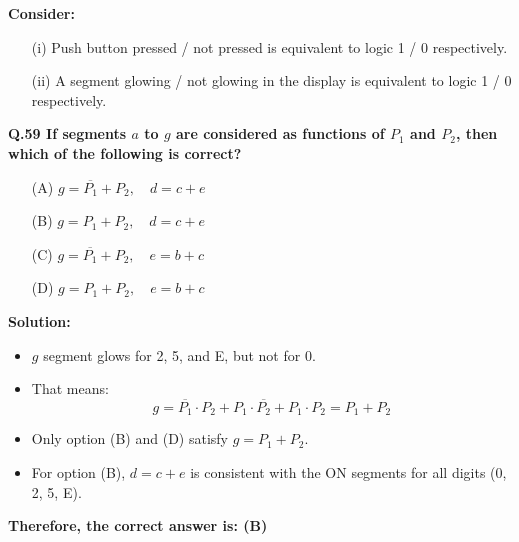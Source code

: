 \documentclass[a4paper,12pt]{article}
\begin{document}
\begin{center}
\end{center}

\vspace{0.5cm}

\textbf{Consider:}
\begin{itemize}
    \item[(i)] Push button pressed / not pressed is equivalent to logic 1 / 0 respectively.
    \item[(ii)] A segment glowing / not glowing in the display is equivalent to logic 1 / 0 respectively.
\end{itemize}
\noindent
\textbf{Q.59 If segments $a$ to $g$ are considered as functions of $P_1$ and $P_2$, then which of the following is correct?}

\begin{enumerate}
    \item[(A)] $g = \overline{P_1} + P_2,\quad d = c + e$
    \item[(B)] $g = P_1 + P_2,\quad d = c + e$
    \item[(C)] $g = \overline{P_1} + P_2,\quad e = b + c$
    \item[(D)] $g = P_1 + P_2,\quad e = b + c$
\end{enumerate}

\vspace{0.5cm}
\newpage
\pagestyle{empty}
\textbf{Solution:}

\begin{itemize}
    \item $g$ segment glows for 2, 5, and E, but not for 0.
    \item That means:
    \[
    g = \overline{P_1}\cdot P_2 + P_1 \cdot \overline{P_2} + P_1 \cdot P_2 = P_1 + P_2
    \]
    \item Only option (B) and (D) satisfy $g = P_1 + P_2$.
    \item For option (B), $d = c + e$ is consistent with the ON segments for all digits (0, 2, 5, E).
\end{itemize}

\textbf{Therefore, the correct answer is: (B)}
\end{document}
